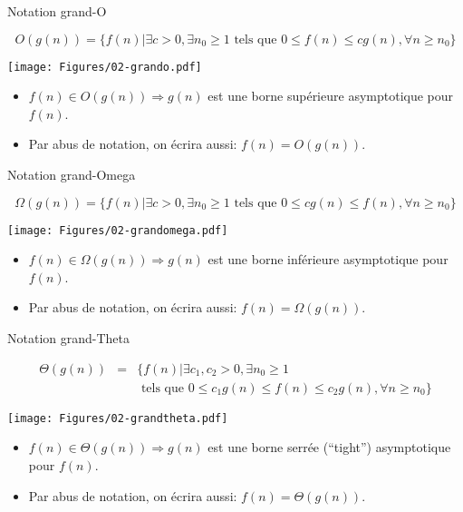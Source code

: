 \begin{frame}{Notation grand-O}

{\small
$$O(g(n))=\{f(n)| \exists c>0, \exists n_0\geq 1\mbox{ tels que } 0\leq f(n)\leq c g(n), \forall n\geq n_0\}$$
}

\medskip

\centerline{\texttt{[image: Figures/02-grando.pdf]}}

\medskip

\begin{itemize}
\item $f(n)\in O(g(n))\Rightarrow g(n)$ est une borne \alert{supérieure} asymptotique pour $f(n)$.
\item Par abus de notation, on écrira aussi: $f(n)=O(g(n))$.
\end{itemize}

\end{frame}

\begin{frame}{Notation grand-Omega}

{\small
$$\Omega(g(n))=\{f(n)| \exists c>0, \exists n_0\geq 1\mbox{ tels que } 0\leq c g(n)\leq f(n), \forall n\geq n_0\}$$
}

\medskip

\centerline{\texttt{[image: Figures/02-grandomega.pdf]}}

\medskip

\begin{itemize}
\item $f(n)\in \Omega(g(n))\Rightarrow g(n)$ est une borne \alert{inférieure} asymptotique pour $f(n)$.
\item Par abus de notation, on écrira aussi: $f(n)=\Omega(g(n))$.
\end{itemize}

\end{frame}

\begin{frame}{Notation grand-Theta}

{\small
\begin{eqnarray*}
\Theta(g(n))&=&\{f(n)| \exists c_1,c_2>0, \exists n_0\geq 1\\
&&\mbox{ tels que } 0\leq c_1 g(n)\leq f(n)\leq c_2 g(n), \forall n\geq n_0\}
\end{eqnarray*}
}

\medskip

\centerline{\texttt{[image: Figures/02-grandtheta.pdf]}}

\medskip

\begin{itemize}
\item $f(n)\in \Theta(g(n))\Rightarrow g(n)$ est une borne \alert{serrée} (``tight'') asymptotique pour $f(n)$.
\item Par abus de notation, on écrira aussi: $f(n)=\Theta(g(n))$.
\end{itemize}

\end{frame}

